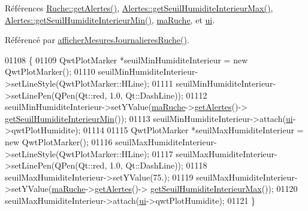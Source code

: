 Références \hyperlink{class_ruche_a9edbc2e81ccb2cb76de43639bcb16ec1}{Ruche\+::get\+Alertes()}, \hyperlink{class_alertes_a86e0bb83ac1fa5e704e3b7b3fc7147cd}{Alertes\+::get\+Seuil\+Humidite\+Interieur\+Max()}, \hyperlink{class_alertes_a40d47b65952035b78cac05b915ad57b8}{Alertes\+::get\+Seuil\+Humidite\+Interieur\+Min()}, \hyperlink{class_ruche_ihm_a43a6b1fa31f4fba58d919daae3707b38}{ma\+Ruche}, et \hyperlink{class_ruche_ihm_a64786058bd7f88ca2f1e9743bb27c25b}{ui}.



Référencé par \hyperlink{class_ruche_ihm_a94bd98327a73a15aad1306fc31f53ce8}{afficher\+Mesures\+Journalieres\+Ruche()}.


\begin{DoxyCode}
01108 \{
01109     QwtPlotMarker *seuilMinHumiditeInterieur = \textcolor{keyword}{new} QwtPlotMarker();
01110     seuilMinHumiditeInterieur->setLineStyle(QwtPlotMarker::HLine);
01111     seuilMinHumiditeInterieur->setLinePen(QPen(Qt::red, 1.0, Qt::DashLine));
01112     seuilMinHumiditeInterieur->setYValue(\hyperlink{class_ruche_ihm_a43a6b1fa31f4fba58d919daae3707b38}{maRuche}->\hyperlink{class_ruche_a9edbc2e81ccb2cb76de43639bcb16ec1}{getAlertes}()->
      \hyperlink{class_alertes_a40d47b65952035b78cac05b915ad57b8}{getSeuilHumiditeInterieurMin}());
01113     seuilMinHumiditeInterieur->attach(\hyperlink{class_ruche_ihm_a64786058bd7f88ca2f1e9743bb27c25b}{ui}->qwtPlotHumidite);
01114 
01115     QwtPlotMarker *seuilMaxHumiditeInterieur = \textcolor{keyword}{new} QwtPlotMarker();
01116     seuilMaxHumiditeInterieur->setLineStyle(QwtPlotMarker::HLine);
01117     seuilMaxHumiditeInterieur->setLinePen(QPen(Qt::red, 1.0, Qt::DashLine));
01118     seuilMaxHumiditeInterieur->setYValue(75.);
01119     seuilMaxHumiditeInterieur->setYValue(\hyperlink{class_ruche_ihm_a43a6b1fa31f4fba58d919daae3707b38}{maRuche}->\hyperlink{class_ruche_a9edbc2e81ccb2cb76de43639bcb16ec1}{getAlertes}()->
      \hyperlink{class_alertes_a86e0bb83ac1fa5e704e3b7b3fc7147cd}{getSeuilHumiditeInterieurMax}());
01120     seuilMaxHumiditeInterieur->attach(\hyperlink{class_ruche_ihm_a64786058bd7f88ca2f1e9743bb27c25b}{ui}->qwtPlotHumidite);
01121 \}
\end{DoxyCode}
\mbox{\label{class_ruche_ihm_a87e4e8d783ea0f15d6304ed604c7ddaa}} 
